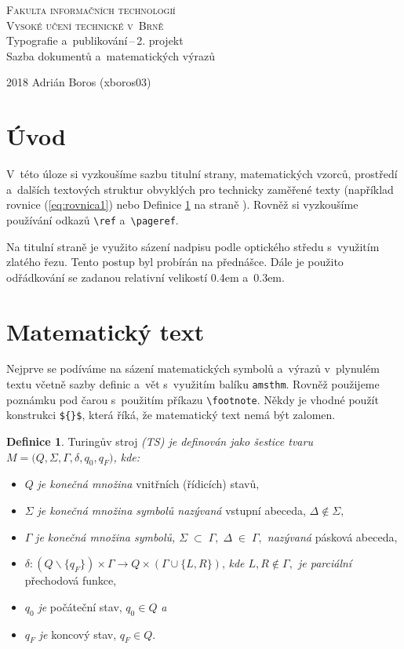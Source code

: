 \documentclass[twocolumn,a4paper,11pt]{article}
\date{}
\theoremstyle{definition}
\newtheorem{definition}{Definice}
\begin{document}
\begin{titlepage}
	\begin{center}
		{\Huge\textsc{Fakulta informačních technologií \\[0.3em]
		Vysoké učení technické v~Brně}}
		{\LARGE	\\ Typografie a~publikování\,--\,2. projekt \\[0.4em]
		Sazba dokumentů a~matematických výrazů}
	\end{center}
{\Large
2018
\hfill Adrián Boros (xboros03)}
\end{titlepage}

\section*{Úvod}
V~této úloze si vyzkoušíme sazbu titulní strany, matematic\-kých
vzorců, prostředí a~dalších textových struktur obvyklých
pro technicky zaměřené texty (například rovnice (\ref{eq:rovnica1})
nebo Definice \ref{def:Definice1} na straně \pageref{def:Definice1}). Rovněž si vyzkoušíme používání
odkazů \verb|\ref| a~\verb|\pageref|.

Na titulní straně je využito sázení nadpisu podle optického
středu s~využitím zlatého řezu. Tento postup byl
probírán na přednášce. Dále je použito odřádkování se
zadanou relativní velikostí 0.4em a~0.3em.

\section{Matematický text}
Nejprve se podíváme na sázení matematických symbolů
a~výrazů v~plynulém textu včetně sazby definic a~vět s~využitím
balíku \texttt{amsthm}. Rovněž použijeme poznámku pod
čarou s~použitím příkazu \verb|\footnote|. Někdy je vhodné
použít konstrukci \verb|${}$|, která říká, že matematický text
nemá být zalomen. 

\begin{definition}
\label{def:Definice1}
Turingův stroj \emph{(TS) je definován jako šestice
tvaru ${M = (Q, \Sigma, \Gamma, \delta, q_0, q_F})$, kde:}
\begin{itemize}
\item ${Q}$ \emph{je konečná množina} vnitřních (řídicích) stavů,
\item ${\Sigma}$ \emph{je konečná množina symbolů nazývaná} vstupní abeceda, ${\Delta \notin \Sigma},$
\item ${\Gamma}$ \emph{je konečná množina symbolů, ${\Sigma\;\subset\;\Gamma,\;\Delta\;\in\;\Gamma},$ nazývaná} pásková abeceda,
\item $\delta: (Q\backslash\{q_F\})\times \Gamma \rightarrow Q\times(\Gamma \cup\{L, R\})$, \emph{kde $L, R\notin\Gamma,$ je parciální} přechodová funkce,
\item $q_0$ \emph{je} počáteční stav, $q_0 \in Q$ \emph{a}
\item $q_F$ \emph{je} koncový stav, $q_F \in Q$. 
\end{itemize}
\end{definition}
\end{document}
